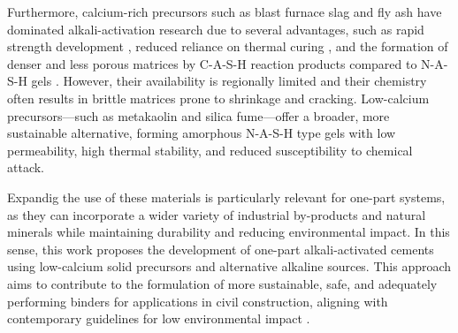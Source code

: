Furthermore, calcium-rich precursors such as blast furnace slag and fly ash have dominated alkali-activation research due to several advantages, such as rapid strength development \cite{provis2014geopolymers}, reduced reliance on thermal curing \cite{ke2021one}, and the formation of denser and less porous matrices by C-A-S-H reaction products compared to N-A-S-H gels \cite{bernal2014engineering}.
However, their availability is regionally limited and their chemistry often results in brittle matrices prone to shrinkage and cracking. Low-calcium precursors—such as metakaolin and silica fume—offer a broader, more sustainable alternative, forming amorphous N-A-S-H type gels with low permeability, high thermal stability, and reduced susceptibility to chemical attack.

Expandig the use of these materials is particularly relevant for one-part systems, as they can incorporate a wider variety of industrial by-products and natural minerals while maintaining durability and reducing environmental impact.
In this sense, this work proposes the development of one-part alkali-activated cements using low-calcium solid precursors and alternative alkaline sources.
This approach aims to contribute to the formulation of more sustainable, safe, and adequately performing binders for applications in civil construction, aligning with contemporary guidelines for low environmental impact \cite{PNRS2016}.